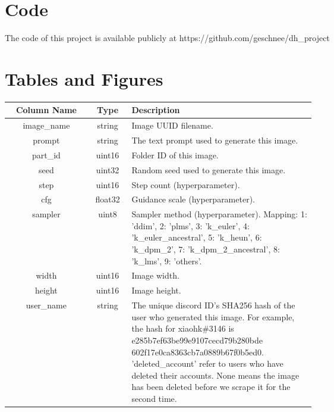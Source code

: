 \label{sec:Appendix}

\section{Code}

The code of this project is available publicly at https://github.com/geschnee/dh\_project

\section{Tables and Figures}


\begin{table}[h]
    \begin{center}
        \begin{tabular}{||c c p{0.6\linewidth}||} 
         \hline
         Column Name & Type & Description \\ [0.5ex] 
         \hline\hline
         image\_name & string & Image UUID filename. \\ 
         \hline
         prompt & string & The text prompt used to generate this image. \\ 
         \hline
         part\_id & uint16 &	Folder ID of this image. \\ 
         \hline
         seed & uint32 & Random seed used to generate this image. \\ 
         \hline
         step & uint16 & Step count (hyperparameter). \\ 
         \hline
         cfg & float32 & Guidance scale (hyperparameter). \\ 
         \hline
         sampler & uint8 & Sampler method (hyperparameter). Mapping: 1: 'ddim', 2: 'plms', 3: 'k\_euler', 4: 'k\_euler\_ancestral', 5: 'k\_heun', 6: 'k\_dpm\_2', 7: 'k\_dpm\_2\_ancestral', 8: 'k\_lms', 9: 'others'. \\ 
         \hline
         width & uint16 & Image width. \\ 
         \hline
         height	& uint16 & Image height. \\ 
         \hline
         user\_name & string & The unique discord ID's SHA256 hash of the user who generated this image. For example, the hash for xiaohk\#3146 is e285b7ef63be99e9107cecd79b280bde 602f17e0ca8363cb7a0889b67f0b5ed0. 'deleted\_account' refer to users who have deleted their accounts. None means the image has been deleted before we scrape it for the second time. \\ 

\end{tabular}
\end{center}
\end{table}
